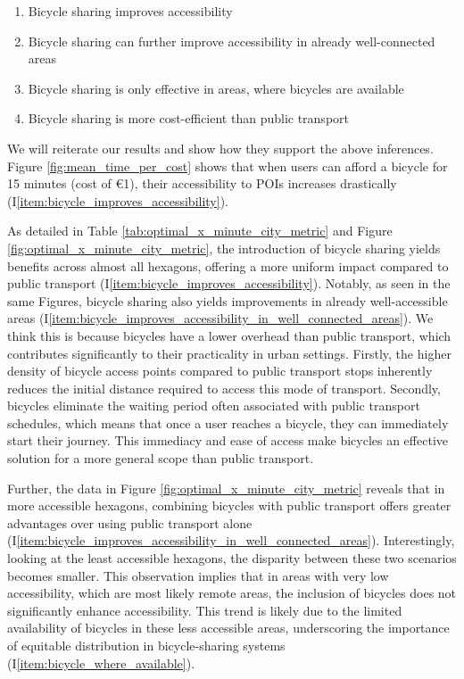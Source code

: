 \begin{enumerate}
  \renewcommand{\labelenumi}{I\theenumi.}
  \item Bicycle sharing improves accessibility \label{item:bicycle_improves_accessibility}
  \item Bicycle sharing can further improve accessibility in already well-connected areas \label{item:bicycle_improves_accessibility_in_well_connected_areas}
  \item Bicycle sharing is only effective in areas, where bicycles are available \label{item:bicycle_where_available}
  \item Bicycle sharing is more cost-efficient than public transport \label{item:bicycle_more_cost_efficient_than_pt}
\end{enumerate}

We will reiterate our results and show how they support the above inferences.
Figure \ref{fig:mean_time_per_cost} shows that when users can afford a bicycle for 15 minutes (cost of \euro{1}), their accessibility to POIs increases drastically (I\ref{item:bicycle_improves_accessibility}).

As detailed in Table \ref{tab:optimal_x_minute_city_metric} and Figure \ref{fig:optimal_x_minute_city_metric}, the introduction of bicycle sharing yields benefits across almost all hexagons, offering a more uniform impact compared to public transport (I\ref{item:bicycle_improves_accessibility}).
Notably, as seen in the same Figures, bicycle sharing also yields improvements in already well-accessible areas (I\ref{item:bicycle_improves_accessibility_in_well_connected_areas}).
We think this is because bicycles have a lower overhead than public transport, which contributes significantly to their practicality in urban settings.
Firstly, the higher density of bicycle access points compared to public transport stops inherently reduces the initial distance required to access this mode of transport. 
Secondly, bicycles eliminate the waiting period often associated with public transport schedules, which means that once a user reaches a bicycle, they can immediately start their journey. 
This immediacy and ease of access make bicycles an effective solution for a more general scope than public transport.

Further, the data in Figure \ref{fig:optimal_x_minute_city_metric} reveals that in more accessible hexagons, combining bicycles with public transport offers greater advantages over using public transport alone (I\ref{item:bicycle_improves_accessibility_in_well_connected_areas}).
Interestingly, looking at the least accessible hexagons, the disparity between these two scenarios becomes smaller. 
This observation implies that in areas with very low accessibility, which are most likely remote areas, the inclusion of bicycles does not significantly enhance accessibility.
This trend is likely due to the limited availability of bicycles in these less accessible areas, underscoring the importance of equitable distribution in bicycle-sharing systems (I\ref{item:bicycle_where_available}).

